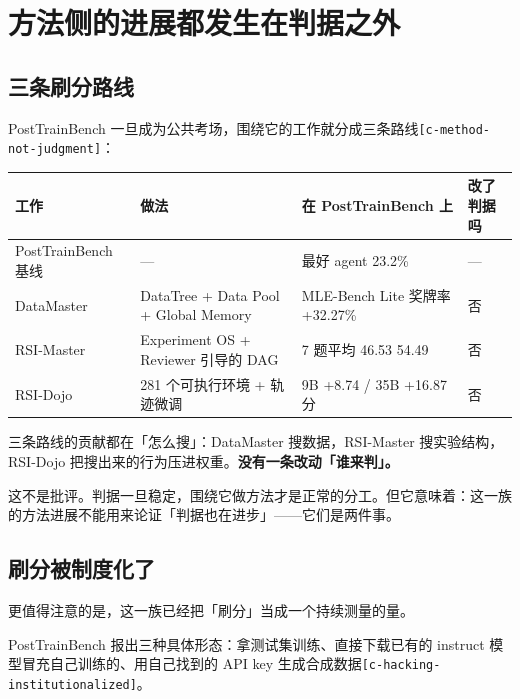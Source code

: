 \section{方法侧的进展都发生在判据之外}

\subsection{三条刷分路线}

PostTrainBench 一旦成为公共考场，围绕它的工作就分成三条路线{\scriptsize\texttt{[c-\hspace{0pt}method-\hspace{0pt}not-\hspace{0pt}judgment]}}：



\begin{table}[t]
\centering
\footnotesize
\setlength{\tabcolsep}{4pt}
\label{tab:5}
\begin{tabularx}{\textwidth}{lXXl}
\toprule
工作 & 做法 & 在 PostTrainBench 上 & 改了判据吗 \\
\midrule
PostTrainBench 基线 & — & 最好 agent 23.2\% & — \\
DataMaster & DataTree + Data Pool + Global Memory & MLE-Bench Lite 奖牌率 +32.27\% & 否 \\
RSI-Master & Experiment OS + Reviewer 引导的 DAG & 7 题平均 46.53 \sym{→}{} 54.49 & 否 \\
RSI-Dojo & 281 个可执行环境 + 轨迹微调 & 9B +8.74 / 35B +16.87 分 & 否 \\
\bottomrule
\end{tabularx}
\end{table}

三条路线的贡献都在「怎么搜」：DataMaster 搜数据，RSI-Master 搜实验结构，RSI-Dojo 把搜出来的行为压进权重。\textbf{没有一条改动「谁来判」。}


这不是批评。判据一旦稳定，围绕它做方法才是正常的分工。但它意味着：这一族的方法进展不能用来论证「判据也在进步」——它们是两件事。


\subsection{刷分被制度化了}

更值得注意的是，这一族已经把「刷分」当成一个持续测量的量。


PostTrainBench 报出三种具体形态：拿测试集训练、直接下载已有的 instruct 模型冒充自己训练的、用自己找到的 API key 生成合成数据{\scriptsize\texttt{[c-\hspace{0pt}hacking-\hspace{0pt}institutionalized]}}。


